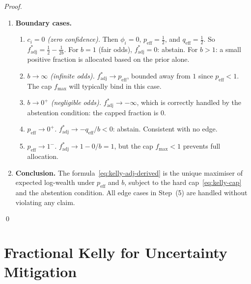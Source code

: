 \documentclass[12pt,openany]{book}
\numberwithin{equation}{chapter}
\theoremstyle{plain}
\theoremstyle{definition}
\theoremstyle{remark}
\numberwithin{equation}{chapter}
\theoremstyle{plain}
\begin{document}
\begin{proof}
\begin{enumerate}
  \item[\textup{(5)}] \textbf{Boundary cases.}
        \begin{enumerate}
          \item[\textup{(5a)}] \textit{$c_i = 0$
                (zero confidence).}
                Then $\phi_i = 0$,
                $p_{\mathrm{eff}} = \tfrac{1}{2}$, and
                $q_{\mathrm{eff}} = \tfrac{1}{2}$.
                So $f^*_{\mathrm{adj}} = \tfrac{1}{2} -
                \tfrac{1}{2b}$.  For $b = 1$ (fair odds),
                $f^*_{\mathrm{adj}} = 0$: abstain.
                For $b > 1$: a small positive fraction is
                allocated based on the prior alone.
          \item[\textup{(5b)}] \textit{$b \to \infty$
                (infinite odds).}
                $f^*_{\mathrm{adj}} \to p_{\mathrm{eff}}$,
                bounded away from $1$ since
                $p_{\mathrm{eff}} < 1$.  The cap
                $f_{\max}$ will typically bind in this case.
          \item[\textup{(5c)}] \textit{$b \to 0^+$
                (negligible odds).}
                $f^*_{\mathrm{adj}} \to -\infty$, which
                is correctly handled by the abstention
                condition: the capped fraction is $0$.
          \item[\textup{(5d)}] \textit{$p_{\mathrm{eff}}
                \to 0^+$.}
                $f^*_{\mathrm{adj}} \to -q_{\mathrm{eff}}/b
                < 0$: abstain.  Consistent with no edge.
          \item[\textup{(5e)}] \textit{$p_{\mathrm{eff}}
                \to 1^-$.}
                $f^*_{\mathrm{adj}} \to 1 - 0/b = 1$,
                but the cap $f_{\max} < 1$ prevents
                full allocation.
        \end{enumerate}

  \item[\textup{(6)}] \textbf{Conclusion.}
        The formula~\eqref{eq:kelly-adj-derived} is the
        unique maximiser of expected log-wealth under
        $p_{\mathrm{eff}}$ and $b$, subject to the hard
        cap~\eqref{eq:kelly-cap} and the abstention
        condition.  All edge cases in Step~(5) are
        handled without violating any claim.
\end{enumerate}
\qed
\end{proof}

\section{Fractional Kelly for Uncertainty Mitigation}
\end{document}
